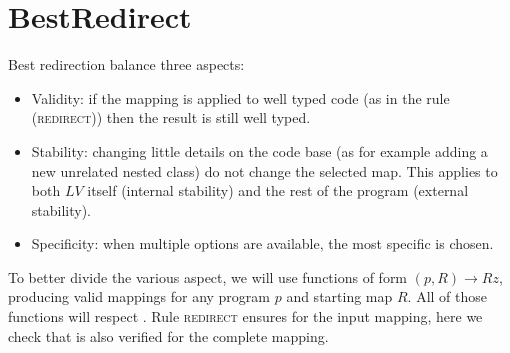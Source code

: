 



\section{BestRedirect}
Best redirection balance three aspects:
\begin{itemize}
\item Validity: if the mapping is applied to well typed code (as in the rule \textsc{(redirect)}) then the result is still well typed.
\item Stability: changing little details on the code base (as for example adding a new unrelated nested class) do not change the selected map.
This applies to both $LV$ itself (internal stability)
and the rest of the program (external stability).
\item Specificity: when multiple options are available, the most specific is chosen.
\end{itemize}

To better divide the various aspect, we will use
functions of form $(p,R)\rightarrow Rz$, producing valid mappings
for any program $p$ and starting map $R$.
All of those functions will respect 
.
Rule \textsc{redirect} ensures 
 for the input mapping,
here we check that is also verified for the complete mapping.

